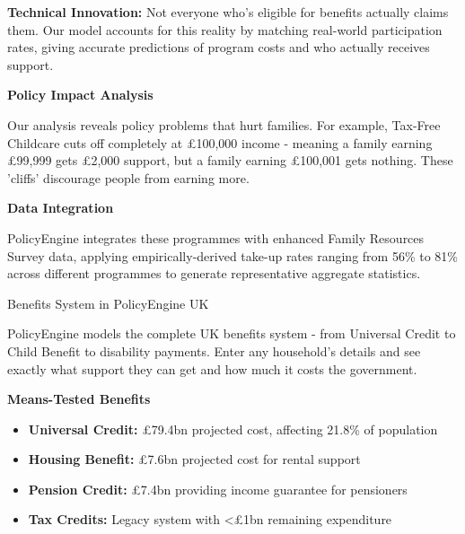 \documentclass[a4paper,11pt]{article}
\newcommand{\highlightbox}[1]{%
    \begin{tcolorbox}[
        colback=lightblue,
        colframe=darkblue,
        leftrule=4mm,
        rightrule=0mm,
        toprule=0mm,
        bottomrule=0mm,
        sharp corners
    ]
    #1
    \end{tcolorbox}
}
\begin{document}
\vspace{15pt}

\highlightbox{
\textbf{Technical Innovation:} Not everyone who's eligible for benefits actually claims them. Our model accounts for this reality by matching real-world participation rates, giving accurate predictions of program costs and who actually receives support.
}

\vspace{15pt}

\textbf{Policy Impact Analysis}

Our analysis reveals policy problems that hurt families. For example, Tax-Free Childcare cuts off completely at £100,000 income - meaning a family earning £99,999 gets £2,000 support, but a family earning £100,001 gets nothing. These 'cliffs' discourage people from earning more.

\vspace{10pt}

\textbf{Data Integration}

PolicyEngine integrates these programmes with enhanced Family Resources Survey data, applying empirically-derived take-up rates ranging from 56\% to 81\% across different programmes to generate representative aggregate statistics.

\newpage

\begin{tcolorbox}[
    colback=darkblue,
    colframe=darkblue,
    rounded corners,
    fontupper=\color{white}\Large\bfseries
]
Benefits System in PolicyEngine UK
\end{tcolorbox}

\vspace{15pt}

\vspace{20pt}

PolicyEngine models the complete UK benefits system - from Universal Credit to Child Benefit to disability payments. Enter any household's details and see exactly what support they can get and how much it costs the government.

\vspace{15pt}

\begin{tcolorbox}[
    colback=lightgray,
    colframe=mediumblue,
    rounded corners,
    leftrule=3mm,
    rightrule=0mm,
    toprule=0mm,
    bottomrule=0mm
]
\textbf{\color{darkblue}Means-Tested Benefits}

\begin{itemize}[leftmargin=15pt]
\item \textbf{Universal Credit:} £79.4bn projected cost, affecting 21.8\% of population
\item \textbf{Housing Benefit:} £7.6bn projected cost for rental support
\item \textbf{Pension Credit:} £7.4bn providing income guarantee for pensioners
\item \textbf{Tax Credits:} Legacy system with <£1bn remaining expenditure
\end{itemize}
\end{tcolorbox}
\end{document}
